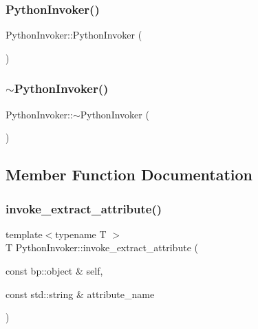 \subsubsection{\texorpdfstring{PythonInvoker()}{PythonInvoker()}}
{\footnotesize\ttfamily Python\+Invoker\+::\+Python\+Invoker (\begin{DoxyParamCaption}{ }\end{DoxyParamCaption})\hspace{0.3cm}{\ttfamily [default]}}

\mbox{\label{class_python_invoker_a63094704db614104680f0afe19d32de1}} 
\subsubsection{\texorpdfstring{$\sim$PythonInvoker()}{~PythonInvoker()}}
{\footnotesize\ttfamily Python\+Invoker\+::$\sim$\+Python\+Invoker (\begin{DoxyParamCaption}{ }\end{DoxyParamCaption})\hspace{0.3cm}{\ttfamily [default]}}



\subsection{Member Function Documentation}
\mbox{\label{class_python_invoker_a97677482144e0d8f64b0c6f6fe6e6636}} 
\subsubsection{\texorpdfstring{invoke\_extract\_attribute()}{invoke\_extract\_attribute()}}
{\footnotesize\ttfamily template$<$typename T $>$ \\
T Python\+Invoker\+::invoke\+\_\+extract\+\_\+attribute (\begin{DoxyParamCaption}\item[{const bp\+::object \&}]{self,  }\item[{const std\+::string \&}]{attribute\+\_\+name }\end{DoxyParamCaption})\hspace{0.3cm}{\ttfamily [inline]}}



